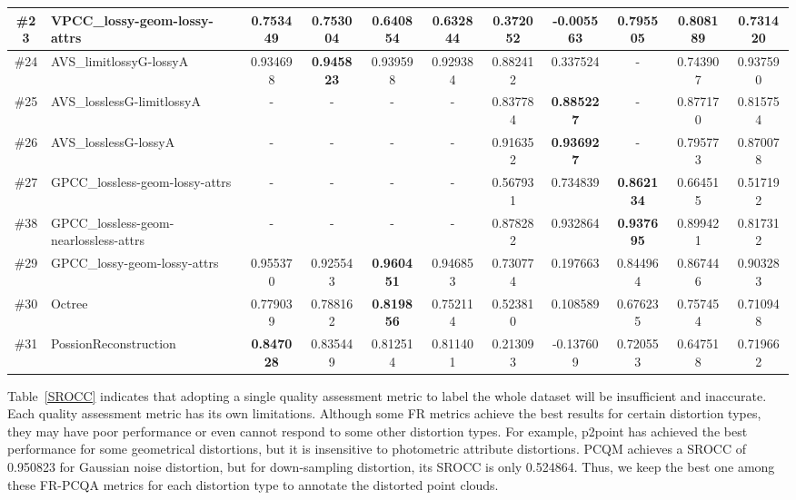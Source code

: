 \documentclass[acmsmall]{acmart}
\begin{document}
\begin{table*}[t]
{\begin{tabular}{c|p{8em}|c|c|c|c|c|c|c|c|c}
    \#23  & VPCC\_lossy-geom-lossy-attrs & 0.753449 & 0.753004 & 0.640854 & 0.632844 & 0.372052 & -0.005563 & 0.795505 & \textbf{0.808189} & 0.731420  \\
    \hline
    \#24  & AVS\_limitlossyG-lossyA & 0.934698 & \textbf{0.945823} & 0.939598 & 0.929384 & 0.882412 & 0.337524 & -     & 0.743907 & 0.937590  \\
    \hline
    \#25  & AVS\_losslessG-limitlossyA & -     & -     & -     & -     & 0.837784 & \textbf{0.885227} & -     & 0.877170 & 0.815754  \\
    \hline
    \#26  & AVS\_losslessG-lossyA & -     & -     & -     & -     & 0.916352 & \textbf{0.936927} & -     & 0.795773 & 0.870078  \\
    \hline
    \#27  & GPCC\_lossless-geom-lossy-attrs & -     & -     & -     & -     & 0.567931 & 0.734839 & \textbf{0.862134} & 0.664515 & 0.517192  \\
    \hline
    \#38  & GPCC\_lossless-geom-nearlossless-attrs & -     & -     & -     & -     & 0.878282 & 0.932864 & \textbf{0.937695} & 0.899421 & 0.817312  \\
    \hline
    \#29  & GPCC\_lossy-geom-lossy-attrs & 0.955370 & 0.925543 & \textbf{0.960451} & 0.946853 & 0.730774 & 0.197663 & 0.844964 & 0.867446 & 0.903283  \\
    \hline
    \#30  & Octree & 0.779039 & 0.788162 & \textbf{0.819856} & 0.752114 & 0.523810 & 0.108589 & 0.676235 & 0.757454 & 0.710948  \\
    \hline
    \#31  & Possion\newline{}Reconstruction & \textbf{0.847028} & 0.835449 & 0.812514 & 0.811401 & 0.213093 & -0.137609 & 0.720553 & 0.647518 & 0.719662  \\
    \hline
    \end{tabular}}
  \label{SROCC}\end{table*}


\par Table~\ref{SROCC} indicates that adopting a single quality assessment metric to label the whole dataset will be insufficient and inaccurate. Each quality assessment metric has its own limitations. Although some FR metrics achieve the best results for certain distortion types, they may have poor performance or even cannot respond to some other distortion types. For example, p2point has achieved the best performance for some geometrical distortions, but it is insensitive to photometric attribute distortions. PCQM achieves a SROCC of 0.950823 for Gaussian noise distortion, but for down-sampling distortion, its SROCC is only 0.524864. Thus, we keep the best one among these FR-PCQA metrics for each distortion type to annotate the distorted point clouds.
\end{document}
